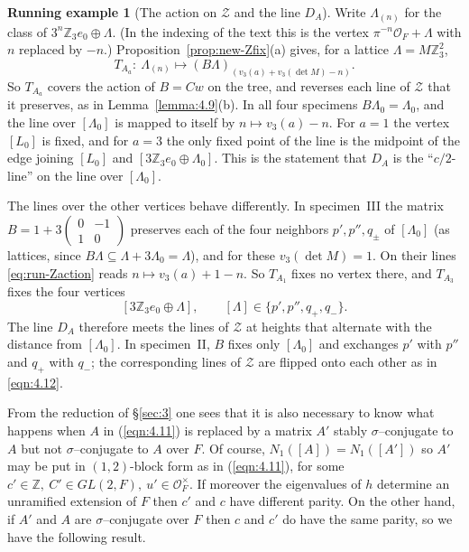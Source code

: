 \documentclass[12pt,letterpaper]{amsart}
\numberwithin{equation}{section}
\theoremstyle{definition}
\newtheorem{runex}[theorem]{Running example}
\theoremstyle{plain}
\newcommand{\smat}[4]{\left(\begin{smallmatrix}#1&#2\\#3&#4\end{smallmatrix}\right)}
\providecommand{\cal}{\mathcal}
\def\zzz{\mathbb{Z}}
\def\off{{\cal O}_F}
\begin{document}
\begin{runex}[The action on $\mathcal Z$ and the line $D_A$]
\label{run:Zaction}
Write $\Lambda_{(n)}$ for the class of $3^n\mathbb Z_3e_0\oplus\Lambda$.
(In the indexing of the text this is the vertex $\pi^{-n}\off+\Lambda$
with $n$ replaced by $-n$.) Proposition~\ref{prop:new-Zfix}(a) gives,
for a lattice $\Lambda=M\mathbb Z_3^2$,
\begin{equation}\label{eq:run-Zaction}
 T_{A_a}\colon\ \Lambda_{(n)}\longmapsto (B\Lambda)_{(v_3(a)+v_3(\det M)-n)} .
\end{equation}
So $T_{A_a}$ covers the action of $B=Cw$ on the tree, and reverses
each line of $\mathcal Z$ that it preserves, as in
Lemma~\ref{lemma:4.9}(b). In all four specimens $B\Lambda_0=\Lambda_0$,
and the line over $[\Lambda_0]$ is mapped to itself by
$n\mapsto v_3(a)-n$. For $a=1$ the vertex $[L_0]$ is fixed, and for
$a=3$ the only fixed point of the line is the midpoint of the edge
joining $[L_0]$ and $[3\mathbb Z_3e_0\oplus\Lambda_0]$. This is the
statement that $D_A$ is the ``$c/2$-line'' on the line over
$[\Lambda_0]$.

The lines over the other vertices behave differently. In
specimen~III the matrix $B=1+3\smat{0}{-1}{1}{0}$ preserves each of the
four neighbors $p',p'',q_\pm$ of $[\Lambda_0]$ (as lattices, since
$B\Lambda\subseteq\Lambda+3\Lambda_0=\Lambda$), and for these
$v_3(\det M)=1$. On their lines \eqref{eq:run-Zaction} reads
$n\mapsto v_3(a)+1-n$. So $T_{A_1}$ fixes no vertex there, and
$T_{A_3}$ fixes the four vertices
\[
 [3\mathbb Z_3e_0\oplus\Lambda],\qquad
 [\Lambda]\in\{p',p'',q_+,q_-\}.
\]
The line $D_A$ therefore meets the lines of $\mathcal Z$ at heights
that alternate with the distance from $[\Lambda_0]$.
In specimen~II, $B$ fixes only $[\Lambda_0]$ and exchanges $p'$ with
$p''$ and $q_+$ with $q_-$; the corresponding lines of $\mathcal Z$
are flipped onto each other as in \eqref{eqn:4.12}.
\end{runex}

From the reduction of \S \ref{sec:3} 
one sees that it is also necessary to know what
happens when $A$ in (\ref{eqn:4.11}) is replaced by a matrix $A'$ 
stably $\sigma$--conjugate
to $A$ but not $\sigma$--conjugate to $A$ over $F$. Of course, 
$N_1([A])=N_1([A'])$ so $A'$ may be put in $(1,2)$-block 
form as in (\ref{eqn:4.11}),
for some $c'\in\zzz ,\ C'\in GL(2,F),\ u'\in\off^{\times}$. 
If moreover the eigenvalues of $h$ determine an unramified 
extension of $F$ then
$c'$ and $c$ have different parity. On the other hand, if $A'$ and $A$
are $\sigma$--conjugate over $F$ then $c$ and $c'$ do have the same parity, so
we have the following result.
\end{document}
